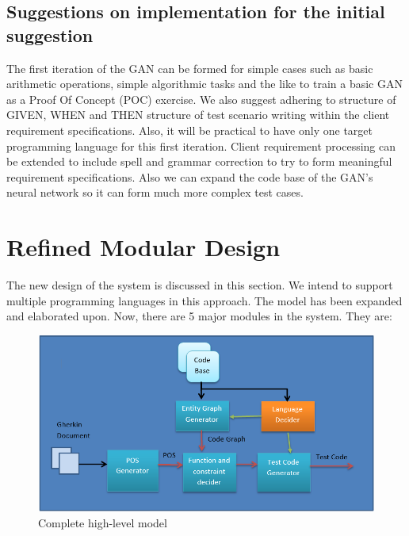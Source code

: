 \documentclass[conference]{IEEEtran}
\begin{document}
\subsection{Suggestions on implementation for the initial suggestion}
The first iteration of the GAN can be formed for simple cases such as basic arithmetic operations, simple algorithmic tasks and the like to train a basic GAN as a Proof Of Concept (POC) exercise. We also suggest adhering to structure of GIVEN, WHEN and THEN structure of test scenario writing within the client requirement specifications. Also, it will be practical to have only one target programming language for this first iteration.
Client requirement processing can be extended to include spell and grammar correction to try to form meaningful requirement specifications. Also we can expand the code base of the GAN's neural network so it can form much more complex test cases.

\section{Refined Modular Design}
The new design of the system is discussed in this section. We intend to support multiple programming languages in this approach. The model has been expanded and elaborated upon. Now, there are 5 major modules in the system. They are:

\begin{figure}
	\includegraphics[width=\linewidth]{Complete_high_level_modules.png}
	\caption{Complete high-level model}
	\label{fig13}
\end{figure}
\end{document}
